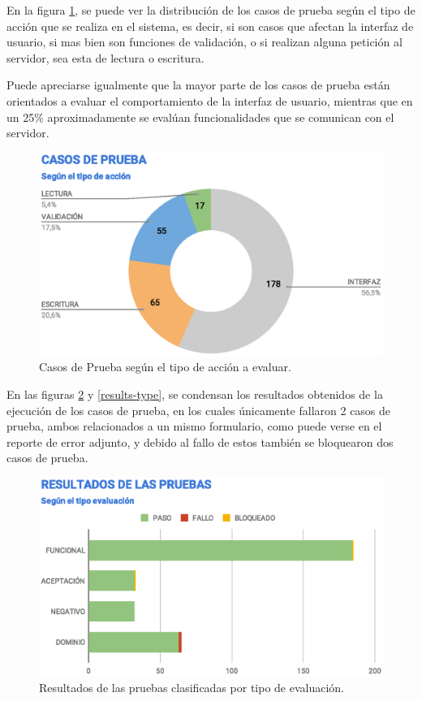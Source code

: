 En la figura \ref{tc-type}, se puede ver la distribución de los casos de prueba
según el tipo de acción que se realiza en el sistema, es decir, si son casos
que afectan la interfaz de usuario, si mas bien son funciones de validación, o
si realizan alguna petición al servidor, sea esta de lectura o escritura.

Puede apreciarse igualmente que la mayor parte de los casos de prueba están
orientados a evaluar el comportamiento de la interfaz de usuario, mientras que
en un 25\% aproximadamente se evalúan funcionalidades que se comunican con el
servidor.

\begin{figure}
\centering
\includegraphics[width=1.0\textwidth]{graphics/tc-type.eps}
\caption{Casos de Prueba según el tipo de acción a evaluar.}
\label{tc-type}
\end{figure}

En las figuras \ref{results-tests} y \ref{results-type}, se condensan los
resultados obtenidos de la ejecución de los casos de prueba, en los cuales
únicamente fallaron 2 casos de prueba, ambos relacionados a un mismo formulario,
como puede verse en el reporte de error adjunto, y debido al fallo de estos
también se bloquearon dos casos de prueba.

\begin{figure}
\centering
\includegraphics[width=1.0\textwidth]{graphics/results-tests.eps}
\caption{Resultados de las pruebas clasificadas por tipo de evaluación.}
\label{results-tests}
\end{figure}

